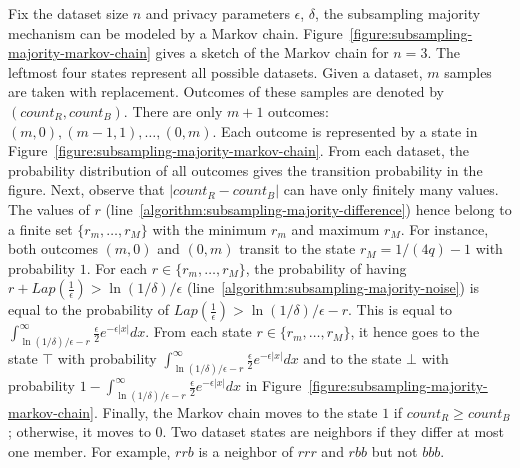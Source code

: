 Fix the dataset size $n$ and privacy parameters $\epsilon$, $\delta$,
the subsampling majority mechanism can be modeled by a Markov chain.
Figure~\ref{figure:subsampling-majority-markov-chain} gives a sketch
of the Markov chain for $n = 3$. The leftmost four states represent
all possible datasets. Given a dataset, $m$ samples are taken with
replacement. Outcomes of these samples are denoted by
$(\mathit{count}_R, \mathit{count}_B)$. There are only $m + 1$
outcomes: $(m, 0), (m - 1, 1), \ldots, (0, m)$. Each outcome is
represented by a state in
Figure~\ref{figure:subsampling-majority-markov-chain}. From each
dataset, the probability distribution of all outcomes gives the
transition probability in the figure. Next, observe that  $|
\mathit{count}_R - \mathit{count}_B |$ can have only finitely many
values. The values of $r$ 
(line~\ref{algorithm:subsampling-majority-difference}) hence belong to
a finite set $\{ r_m, \ldots, r_M \}$ with the minimum $r_m$ and
maximum $r_M$. 
For instance,
both outcomes $(m, 0)$ and $(0, m)$ transit to the state $r_M = 1/(4q)
- 1$ with probability $1$. For each $r \in \{ r_m, \ldots, r_M \}$,
the probability of having $r + \mathit{Lap}(\frac{1}{\epsilon}) > \ln
(1/\delta)/\epsilon$ (line~\ref{algorithm:subsampling-majority-noise})
is equal to the probability of $\mathit{Lap}(\frac{1}{\epsilon}) > \ln
(1/\delta)/\epsilon - r$. This is equal to $\int^{\infty}_{\ln
  (1/\delta)/\epsilon - r} \frac{\epsilon}{2}e^{-\epsilon|x|} dx$.
From each state $r \in \{ r_m, \ldots, r_M \}$, it hence goes to the state
$\top$ with probability $\int^{\infty}_{\ln (1/\delta)/\epsilon - r}
\frac{\epsilon}{2}e^{-\epsilon|x|} dx$ and to the state $\bot$ with
probability $1 - \int^{\infty}_{\ln (1/\delta)/\epsilon - r}
\frac{\epsilon}{2}e^{-\epsilon|x|} dx$ in
Figure~\ref{figure:subsampling-majority-markov-chain}. Finally, the
Markov chain 
moves to the state $1$ if $\mathit{count}_R \geq \mathit{count}_B$;
otherwise, it moves to $0$. Two dataset states are neighbors if they
differ at most one member. For example, $rrb$ is a neighbor
of $rrr$ and $rbb$ but not $bbb$.


